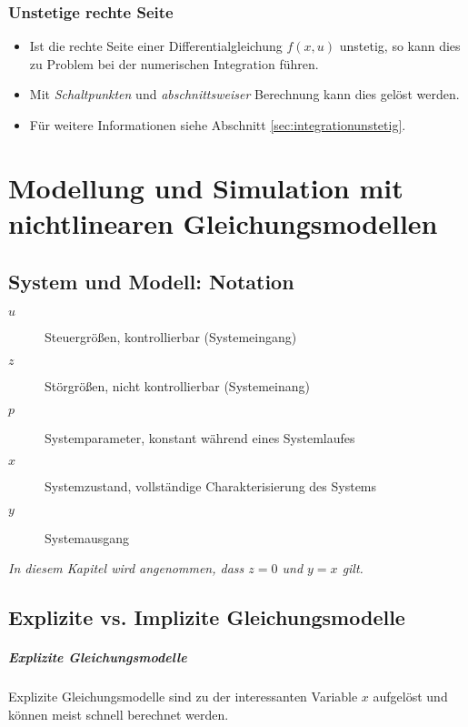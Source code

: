         \subsection{Unstetige rechte Seite} %
            \begin{itemize}
            	\item Ist die rechte Seite einer Differentialgleichung \( f(x, u) \) unstetig, so kann dies zu Problem bei der numerischen Integration führen.
            	\item Mit \textit{Schaltpunkten} und \textit{abschnittsweiser} Berechnung kann dies gelöst werden.
            	\item Für weitere Informationen siehe Abschnitt \ref{sec:integrationunstetig}.
            \end{itemize}

\chapter{Modellung und Simulation mit nichtlinearen Gleichungsmodellen} %
    \section{System und Modell: Notation} %
        \begin{description}
        	\item[\(u\)] Steuergrößen, kontrollierbar (Systemeingang)
        	\item[\(z\)] Störgrößen, nicht kontrollierbar (Systemeinang)
        	\item[\(p\)] Systemparameter, konstant während eines Systemlaufes
        	\item[\(x\)] Systemzustand, vollständige Charakterisierung des Systems
        	\item[\(y\)] Systemausgang
        \end{description}
        
        
        \textit{In diesem Kapitel wird angenommen, dass \( z = 0 \) und \( y = x \) gilt.}

    \section{Explizite vs. Implizite Gleichungsmodelle} %
        \paragraph{Explizite Gleichungsmodelle}
            Explizite Gleichungsmodelle sind zu der interessanten Variable \( x \) aufgelöst und können meist schnell berechnet werden.
        
